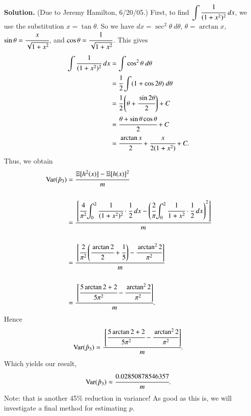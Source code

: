 \documentclass[11pt,english]{scrbook}
\begin{document}
\begin{enumerate}
\textbf{Solution.} (Due to Jeremy Hamilton, 6/20/05.)
First, to find \({\displaystyle \int\cfrac{1}{(1+x^{2})^{2}}\ dx}\), we use the substitution \(x=\tan{\theta}\). So we have \(dx=\sec^{2}{\theta}\ d\theta\), \(\theta=\arctan{x}\), \({\displaystyle \sin{\theta}=\cfrac{x}{\sqrt{1+x^{2}}}}\), and \({\displaystyle \cos{\theta}=\cfrac{1}{\sqrt{1+x^{2}}}}\). This gives 
\begin{align*}
\int\cfrac{1}{(1+x^{2})^{2}}\ dx & =\int\cos^{2}{\theta}\ d\theta\\
& =\cfrac{1}{2}\int(1+\cos{2\theta})\ d\theta\\
& =\cfrac{1}{2}\left(\theta+\cfrac{\sin{2\theta}}{2}\right)+C\\
& =\cfrac{\theta+\sin{\theta}\cos{\theta}}{2}+C\\
& =\cfrac{\arctan{x}}{2}+\cfrac{x}{2(1+x^{2})}+C.
\end{align*}
Thus, we obtain
\begin{align*}
\text{Var}(\hat{p}_{3}) & =\cfrac{\mathbb{E}[h^{2}(x)]-\mathbb{E}[h(x)]^{2}}{m}\\
\\ & =\cfrac{\left[\cfrac{4}{\pi^{2}}{\displaystyle \int_{0}^{2}\cfrac{1}{(1+x^{2})^{2}}\cdot\cfrac{1}{2}\ dx}-\left(\cfrac{2}{\pi}{\displaystyle \int_{0}^{2}\cfrac{1}{1+x^{2}}\cdot\cfrac{1}{2}\ dx}\right)^{2}\right]}{m}\\
\\ & =\cfrac{\left[\cfrac{2}{\pi^{2}}\left(\cfrac{\arctan{2}}{2}+\cfrac{1}{5}\right)-\cfrac{\arctan^{2}{2}}{\pi^{2}}\right]}{m}\\
\\ & =\cfrac{\left[\cfrac{5\arctan{2}+2}{5\pi^{2}}-\cfrac{\arctan^{2}{2}}{\pi^{2}}\right]}{m}.
\end{align*}
Hence
\[
   \text{Var}(\hat{p}_{3})=\cfrac{\left[\cfrac{5\arctan{2}+2}{5\pi^{2}}-\cfrac{\arctan^{2}{2}}{\pi^{2}}\right]}{m}.
   \]
Which yields our result,
\[
   \text{Var}(\hat{p}_{3})\approx\cfrac{0.02850878546357}{m}.
   \]
Note: that is another 45\% reduction in variance! As good as this is, we will investigate a final method for estimating \(p\).


\end{enumerate}
\end{document}
